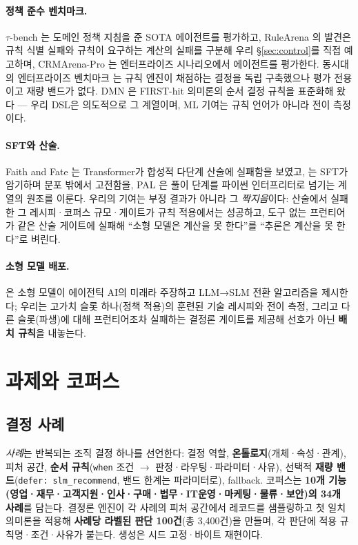 \documentclass[11pt]{article}
\begin{document}
\paragraph{정책 준수 벤치마크.} $\tau$-bench \citep{taubench2024}는 도메인 정책 지침을 준 SOTA 에이전트를 평가하고, RuleArena \citep{rulearena2024}의 발견은 규칙 식별 실패와 규칙이 요구하는 계산의 실패를 구분해 우리 \S\ref{sec:control}를 직접 예고하며, CRMArena-Pro \citep{crmarena2025}는 엔터프라이즈 시나리오에서 에이전트를 평가한다. 동시대의 엔터프라이즈 벤치마크 \citep{enterprisebench2026}는 규칙 엔진이 채점하는 결정을 독립 구축했으나 평가 전용이고 재량 밴드가 없다. DMN \citep{dmn2024}은 FIRST-hit 의미론의 순서 결정 규칙을 표준화해 왔다 --- 우리 DSL은 의도적으로 그 계열이며, ML 기여는 규칙 언어가 아니라 전이 측정이다.

\paragraph{SFT와 산술.} Faith and Fate \citep{faithfate2023}는 Transformer가 합성적 다단계 산술에 실패함을 보였고, \citet{sftmemorizes2025}는 SFT가 암기하며 분포 밖에서 고전함을, PAL \citep{pal2022}은 풀이 단계를 파이썬 인터프리터로 넘기는 계열의 원조를 이룬다. 우리의 기여는 부정 결과가 아니라 그 \emph{짝지음}이다: 산술에서 실패한 그 레시피·코퍼스 규모·게이트가 규칙 적용에서는 성공하고, 도구 없는 프런티어가 같은 산술 게이트에 실패해 ``소형 모델은 계산을 못 한다''를 ``추론은 계산을 못 한다''로 벼린다.

\paragraph{소형 모델 배포.} \citet{slmposition2025}은 소형 모델이 에이전틱 AI의 미래라 주장하고 LLM→SLM 전환 알고리즘을 제시한다; 우리는 고가치 슬롯 하나(정책 적용)의 훈련된 기술 레시피와 전이 측정, 그리고 다른 슬롯(파생)에 대해 프런티어조차 실패하는 결정론 게이트를 제공해 선호가 아닌 \textbf{배치 규칙}을 내놓는다.

\section{과제와 코퍼스}\label{sec:task}

\subsection{결정 사례}
\emph{사례}는 반복되는 조직 결정 하나를 선언한다: 결정 역할, \textbf{온톨로지}(개체·속성·관계), 피처 공간, \textbf{순서 규칙}(\texttt{when} 조건 $\rightarrow$ 판정·라우팅·파라미터·사유), 선택적 \textbf{재량 밴드}(\texttt{defer: slm\_recommend}, 밴드 한계는 파라미터로), fallback. 코퍼스는 \textbf{10개 기능(영업·재무·고객지원·인사·구매·법무·IT운영·마케팅·물류·보안)의 34개 사례}를 담는다. 결정론 엔진이 각 사례의 피처 공간에서 레코드를 샘플링하고 첫 일치 의미론을 적용해 \textbf{사례당 라벨된 판단 100건}(총 3{,}400건)을 만들며, 각 판단에 적용 규칙명·조건·사유가 붙는다. 생성은 시드 고정·바이트 재현이다.
\end{document}
